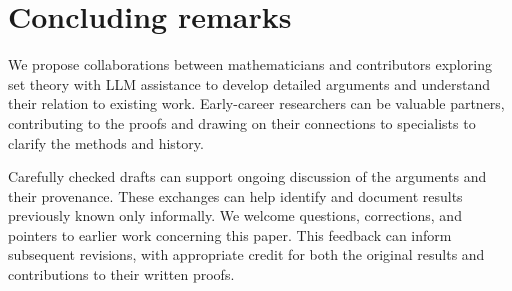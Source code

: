 \documentclass[11pt,a4paper]{amsart}
\newif\ifrevisionblue
\DeclareRobustCommand{\revision}[1]{{\ifrevisionblue\color{blue}\fi#1}}
\theoremstyle{plain}
\theoremstyle{definition}
\theoremstyle{remark}
\begin{document}
\section*{\revision{Concluding remarks}}

\revision{We propose collaborations between mathematicians and
contributors exploring set theory with LLM assistance to develop
detailed arguments and understand their relation to existing work.
Early-career researchers can be valuable partners, contributing to
the proofs and drawing on their connections to specialists to
clarify the methods and history.}

\revision{Carefully checked drafts can support ongoing discussion of the
arguments and their provenance. These exchanges can help identify
and document results previously known only informally. We welcome
questions, corrections, and pointers to earlier work concerning this
paper. This feedback can inform subsequent revisions, with appropriate
credit for both the original results and contributions to their
written proofs.}
\end{document}
